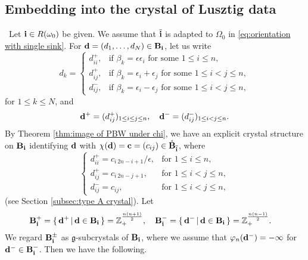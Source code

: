 \documentclass[leqno,11pt]{amsart}
\numberwithin{equation}{section}
\newcommand{\bs}{\boldsymbol}
\newcommand{\B}{\mathbf{B}}
\newcommand{\ov}{\overline}
\newcommand{\bi}{\bs{\rm i}}
\newcommand{\Z}{\mathbb{Z}}
\newcommand{\g}{\mathfrak{g}}
\begin{document}
\subsection{Embedding into the crystal of Lusztig data}\
Let $\bi\in R(\omega_0)$ be given. We assume that $\ov{\bi}$ is adapted to $\Omega_0$ in \eqref{eq:orientation with single sink}. For ${\bf d}=(d_1,\ldots,d_N)\in \B_{\bi}$, let us write
\begin{equation*}
d_k=
\begin{cases}
d^+_{ii}, & \text{if $\beta_k=\epsilon \epsilon_i$ for some $1\leq i\leq n$},\\
d^+_{ij}, & \text{if $\beta_k=\epsilon_i + \epsilon_j$ for some $1\leq i<j\leq n$},\\
d^-_{ij}, & \text{if $\beta_k=\epsilon_i - \epsilon_j$ for some $1\leq i<j\leq n$},
\end{cases}
\end{equation*}
for $1\leq k\leq N$, and  
\begin{equation*}
{\bf d}^+=(d^+_{ij})_{1\leq i\leq j\leq n},\quad {\bf d}^-=(d^-_{ij})_{1\leq i<j\leq n}.
\end{equation*}
By Theorem \ref{thm:image of PBW under chi}, we have an explicit crystal structure on $\B_{\bi}$ identifying ${\bf d}$ with $\chi({\bf d})={\bf c}=(c_{ij})\in \mathring{\B}_{\ov{\bi}}$, where  
\begin{equation*}\label{eq:d_ij}
\begin{cases}
d^+_{ii}=c_{i\, 2n-i+1}/\epsilon, & \text{for $1\leq i\leq n$},\\
d^+_{ij}=c_{i\,2n- j+1}, & \text{for $1\leq i< j\leq n$},\\
d^-_{ij}=c_{ij},& \text{for $1\leq i<j\leq n$}, 
\end{cases}
\end{equation*}
(see Section \ref{subsec:type A crystal}).
Let 
\begin{equation*}
\begin{split}
\B_{\bi}^+&=\{\,{\bf d}^+\,|\,{\bf d}\in \B_{\bi}\,\}=\Z_+^{\frac{n(n+1)}{2}},\quad 
\B_{\bi}^-=\{\,{\bf d}^-\,|\,{\bf d}\in \B_{\bi}\,\}=\Z_+^{\frac{n(n-1)}{2}}.
\end{split}
\end{equation*}
We regard $\B^\pm_{\bi}$ as $\g$-subcrystals of $\B_{\bi}$, where we assume that $\varphi_n({\bf d}^-)=-\infty$ for ${\bf d}^-\in \B_{\bi}^-$. Then we have the following.
\end{document}

